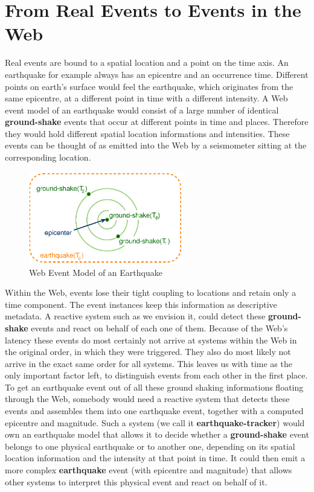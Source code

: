 \section{From Real Events to Events in the Web}
Real events are bound to a spatial location and a point on the time axis.
An earthquake for example always has an epicentre and an occurrence time.
Different points on earth's surface would feel the earthquake, which originates from the same epicentre, at a different point in time with a different intensity.
A Web event model of an earthquake would consist of a large number of identical \textrm{\textbf{ground-shake}} events that occur at different points in time and places.
Therefore they would hold different spatial location informations and intensities.
These events can be thought of as emitted into the Web by a seismometer sitting at the corresponding location.
\begin{figure}[!ht]
  \centering
  \includegraphics[width=0.6\textwidth]{figures/Earthquake}
  \caption{Web Event Model of an Earthquake}
  \label{fig:Earthquake}
\end{figure}
Within the Web, events lose their tight coupling to locations and retain only a time component.
The event instances keep this information as descriptive metadata.
A reactive system such as we envision it, could detect these \textrm{\textbf{ground-shake}} events and react on behalf of each one of them.
Because of the Web's latency these events do most certainly not arrive at systems within the Web in the original order, in which they were triggered.
They also do most likely not arrive in the exact same order for all systems.
This leaves us with time as the only important factor left, to distinguish events from each other in the first place.
To get an earthquake event out of all these ground shaking informations floating through the Web, somebody would need a reactive system that detects these events and assembles them into one earthquake event, together with a computed epicentre and magnitude.
Such a system (we call it \textrm{\textbf{earthquake-tracker}}) would own an earthquake model that allows it to decide whether a \textrm{\textbf{ground-shake}} event belongs to one physical earthquake or to another one, depending on its spatial location information and the intensity at that point in time.
It could then emit a more complex \textrm{\textbf{earthquake}} event (with epicentre and magnitude) that allows other systems to interpret this physical event and react on behalf of it.

